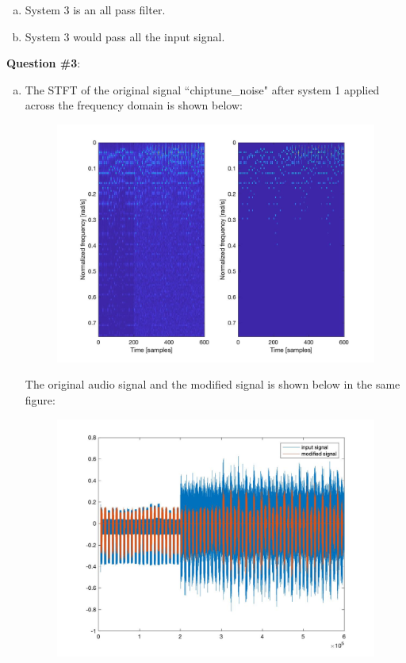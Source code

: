 \documentclass[a4paper]{article}
\begin{document}
\begin{spacing}{2.0}
\begin{enumerate}[(a)]
\item System 3 is an all pass filter.

\item System 3 would pass all the input signal.
\end{enumerate}


\Large\textbf{Question \#3}:  
\normalsize
\begin{enumerate}[(a)]
\item The STFT of the original signal ``chiptune\_noise" after system 1 applied across the frequency domain is shown below:
\begin{figure}[H]
\centering
\includegraphics[width=5in]{3a.jpg}
\label{fig:graph}
\end{figure}
The original audio signal and the modified signal is shown below in the same figure:
\begin{figure}[H]
\centering
\includegraphics[width=5in]{3a_audio.jpg}
\label{fig:graph}
\end{figure}


\end{enumerate}
\end{spacing}
\end{document}
